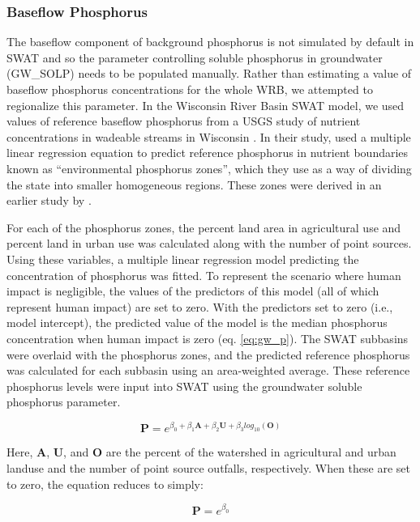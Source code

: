 \subsubsection{Baseflow Phosphorus} \label{sec:gwp}
	The baseflow component of background phosphorus is not simulated by default in SWAT and so the parameter controlling soluble phosphorus in groundwater (GW\_SOLP) needs to be populated manually. Rather than estimating a value of baseflow phosphorus concentrations for the whole WRB, we attempted to regionalize this parameter. In the Wisconsin River Basin SWAT model, we used values of reference baseflow phosphorus from a USGS study of nutrient concentrations in wadeable streams in Wisconsin \citep{robertson_wadeable_2006}. In their study, \citet{robertson_wadeable_2006} used a multiple linear regression equation to predict reference phosphorus in nutrient boundaries known as ``environmental phosphorus zones'', which they use as a way of dividing the state into smaller homogeneous regions. These zones were derived in an earlier study by \citet{robertson_phosphoruszones_2006}.

	
	For each of the phosphorus zones, the percent land area in agricultural use and percent land in urban use was calculated along with the number of point sources. Using these variables, a multiple linear regression model predicting the concentration of phosphorus was fitted. To represent the scenario where human impact is negligible, the values of the predictors of this model (all of which represent human impact) are set to zero. With the predictors set to zero (i.e., model intercept), the predicted value of the model is the median phosphorus concentration when human impact is zero (eq. \ref{eq:gw_p}). The SWAT subbasins were overlaid with the phosphorus zones, and the predicted reference phosphorus was calculated for each subbasin using an area-weighted average. These reference phosphorus levels were input into SWAT using the groundwater soluble phosphorus parameter.
	
	
	\begin{equation}
	\bm{P} = e^{\beta_0 + \beta_1 \bm{A} + \beta_2 \bm{U} + \beta_3 log_{10}(\bm{O})}
	\label{eq:gw_p}
	\end{equation}
		
	Here, $\bm{A}$, $\bm{U}$, and $\bm{O}$ are the percent of the watershed in agricultural and urban landuse and the number of point source outfalls, respectively. When these are set to zero, the equation reduces to simply:
	
	\begin{equation}
	\bm{P} = e^{\beta_0}
	\end{equation}
	
